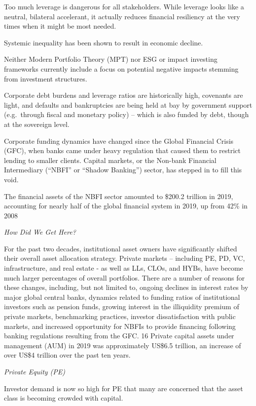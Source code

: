 \documentclass[
]{book}
\begin{document}
Too much leverage is dangerous for all stakeholders.
While leverage looks like a neutral, bilateral accelerant, it
actually reduces financial resiliency at the very times when it might be most needed.

Systemic inequality has been shown to result in economic decline.

Neither Modern Portfolio Theory (MPT) nor ESG or impact investing frameworks
currently include a focus on potential negative impacts stemming from
investment structures.

Corporate debt burdens and leverage ratios are historically high, covenants are light, and
defaults and bankruptcies are being held at bay by government support
(e.g.~through fiscal and monetary policy) -- which is also funded by debt,
though at the sovereign level.

Corporate funding dynamics have changed since the Global Financial Crisis
(GFC), when banks came under heavy regulation that caused them to
restrict lending to smaller clients.
Capital markets, or the Non-bank Financial Intermediary
(``NBFI'' or ``Shadow Banking'') sector, has stepped in to fill this void.

The financial assets of the NBFI sector amounted to \$200.2 trillion in 2019,
accounting for nearly half of the global financial system in 2019, up from 42\%
in 2008

\emph{How Did We Get Here?}

For the past two decades, institutional asset owners have significantly shifted their overall asset
allocation strategy. Private markets -- including PE, PD, VC, infrastructure, and real estate - as well as LLs,
CLOs, and HYBs, have become much larger percentages of overall portfolios. There are a number of
reasons for these changes, including, but not limited to, ongoing declines in interest rates by major
global central banks, dynamics related to funding ratios of institutional investors such as pension funds,
growing interest in the illiquidity premium of private markets, benchmarking practices, investor
dissatisfaction with public markets, and increased opportunity for NBFIs to provide financing following
banking regulations resulting from the GFC. 16 Private capital assets under management (AUM) in 2019
was approximately US\$6.5 trillion, an increase of over US\$4 trillion over the past ten years.

\emph{Private Equity (PE)}

Investor demand is now so high for PE that many are concerned that the asset class is becoming crowded with capital.
\end{document}
